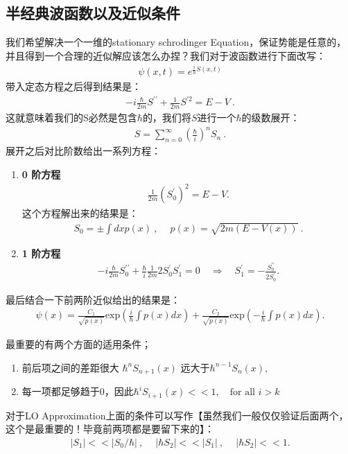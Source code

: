 \subsection{半经典波函数以及近似条件}


我们希望解决一个一维的stationary schrodinger
Equation，保证势能是任意的，并且得到一个合理的近似解应该怎么办捏？我们对于波函数进行下面改写：
\begin{align}
  \psi(x,t)=e^{\frac{i}{\hbar}S(x,t)}
\end{align}
带入定态方程之后得到结果是：
\begin{align}
  -i\frac{\hbar}{2m}S^{\prime\prime}+\frac{1}{2m}S^{\prime2}=E-V\mathrm{~.}
\end{align}
这就意味着我们的S必然是包含$ \hbar $的，我们将$ S $进行一个$ \hbar $的级数展开：
\begin{align}
  S=\sum_{n=0}^\infty\left(\frac{\hbar}{i}\right)^nS_n\mathrm{~.}
\end{align}
展开之后对比阶数给出一系列方程：
\begin{enumerate}
  \item \textbf{0 阶方程}
    \begin{align}
      \frac{1}{2m}\left(S_0^{\prime}\right)^2=E-V.
    \end{align}
    这个方程解出来的结果是：
    \begin{align}
      S_0=\pm\int dxp(x)\mathrm{~,~}\quad p(x)=\sqrt{2m(E-V(x))}\mathrm{~.}
    \end{align}
  \item \textbf{1 阶方程}
    \begin{align}
      -i\frac{\hbar}{2m}S_0^{\prime\prime}+\frac{\hbar}{i}\frac{1}{2m}2S_0^{\prime}S_1^{\prime}=0\quad\Rightarrow\quad
      S_1^{\prime}=-\frac{S_0^{\prime\prime}}{2S_0^{\prime}}.
    \end{align}
\end{enumerate}
最后结合一下前两阶近似给出的结果是：
\begin{align}
  \psi(x)=\frac{C_1}{\sqrt{p(x)}}\mathrm{exp}\left(\frac{i}{\hbar}\int
  p(x)dx\right)+\frac{C_2}{\sqrt{p(x)}}\mathrm{exp}\left(-\frac{i}{\hbar}\int
  p(x)dx\right).
\end{align}

\bigskip
{}

最重要的有两个方面的适用条件；
\begin{enumerate}
  \item 前后项之间的差距很大 $ \hbar^nS_{n+1}(x)$ 远大于$\hbar^{n-1}S_n(x), $
  \item 每一项都足够趋于0，因此$ \hbar^iS_{i+1}(x) << 1 ,\quad\text{for all }i>k $
\end{enumerate}
对于LO Approximation上面的条件可以写作【虽然我们一般仅仅验证后面两个，这个是最重要的！毕竟前两项都是要留下来的】：
\begin{align}
  |S_{1}|<<|S_{0}/\hbar|\mathrm{~,~}\quad|\hbar
  S_{2}|<<|S_{1}|\mathrm{~,~}\quad|\hbar S_{2}|<<1.
\end{align}

